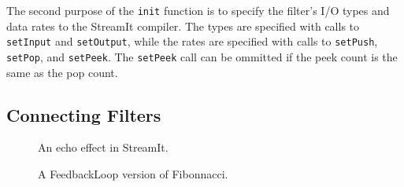 The second purpose of the {\tt init} function is to specify the
filter's I/O types and data rates to the StreamIt compiler.  The types
are specified with calls to {\tt setInput} and {\tt setOutput}, while
the rates are specified with calls to {\tt setPush}, {\tt setPop}, and
{\tt setPeek}.  The {\tt setPeek} call can be ommitted if the peek
count is the same as the pop count.



\subsection{Connecting Filters}
\label{sec:connecting}

\begin{figure}[t]
\begin{minipage}{3in}
\caption{\protect\small An echo effect in StreamIt.
\protect\label{fig:echo}}
\vspace{8pt}
\end{minipage}
\begin{minipage}{3in}
\caption{\protect\small A FeedbackLoop version of Fibonnacci.
\protect\label{fig:feed}}
\end{minipage}
\end{figure}

